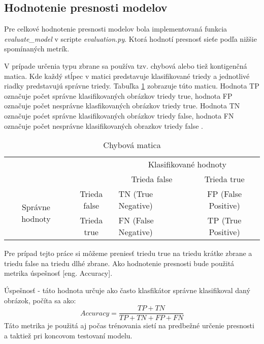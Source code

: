 \subsection{Hodnotenie presnosti modelov}
\label{subsec:hodnoteniepresnosti}
Pre celkové hodnotenie presnosti modelov bola implementovaná funkcia \textit{evaluate\_model} v scripte \textit{evaluation.py}.
Ktorá hodnotí presnosť sieťe podľa nižšie spomínaných metrík.

V prípade určenia typu zbrane sa používa tzv. chybová alebo tiež kontigenčná matica.
Kde každý stĺpec v matici predstavuje klasifikované triedy a jednotlivé riadky predstavujú správne triedy.
Tabuľka \ref{tab:chybovamatica} zobrazuje túto maticu.
Hodnota TP označuje počet správne klasifikovaných obrázkov triedy true, hodnota FP označuje počet nesprávne klasfikovaných obrázkov triedy true.
Hodnota TN označuje poćet správne klasifikovaných obrázkov triedy false, hodnota FN označuje počet nesprávne klasifikovaných obrazkov triedy false \cite{odkaz:ChybovaMatica}.
\begin{table}[H]
    \centering
    \label{tab:chybovamatica}
        \begin{tabular}{lllc}
                                                                &                                   & \multicolumn{2}{c}{Klasifikované hodnoty}                                           \\ \cline{3-4} 
                                                                & \multicolumn{1}{l|}{}             & \multicolumn{1}{c|}{Trieda false}        & \multicolumn{1}{c|}{Trieda true}         \\ \cline{2-4} 
        \multicolumn{1}{c|}{\multirow{2}{*}{Správne hodnoty}} & \multicolumn{1}{c|}{Trieda false} & \multicolumn{1}{l|}{TN (True Negative)}  & \multicolumn{1}{c|}{FP (False Positive)} \\ \cline{2-4} 
        \multicolumn{1}{c|}{}                                 & \multicolumn{1}{c|}{Trieda true}  & \multicolumn{1}{l|}{FN (False Negative)} & \multicolumn{1}{c|}{TP (True Positive)}  \\ \cline{2-4} 
    \end{tabular}
    \caption{Chybová matica}
\end{table}
Pre prípad tejto práce si môžeme preniesť triedu true na triedu krátke zbrane a triedu false na triedu dlhé zbrane.
Ako hodnotenie presnosti bude použitá metrika úspešnosť [eng. Accuracy].

Úspešnosť - táto hodnota určuje ako často klasfikátor správne klasifikoval daný obrázok, počíta sa ako:
\begin{equation}
    Accuracy = \frac{TP + TN}{TP + TN + FP + FN}
\end{equation}
Táto metrika je použitá aj počas trénovania sietí na predbežné určenie presnosti a taktiež pri koncovom testovaní modelu.


